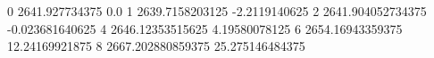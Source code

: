 0 2641.927734375 0.0
1 2639.7158203125 -2.2119140625
2 2641.904052734375 -0.023681640625
4 2646.12353515625 4.19580078125
6 2654.16943359375 12.24169921875
8 2667.202880859375 25.275146484375
